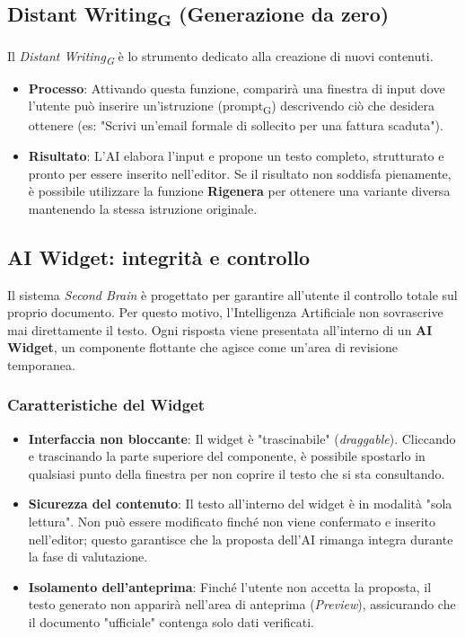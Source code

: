 \documentclass[11pt,a4paper]{article}
\newcommand{\gls}[1]{#1\textsubscript{G}}
\begin{document}
\subsection{\gls{Distant Writing} (Generazione da zero)}
Il \textit{\gls{Distant Writing}} è lo strumento dedicato alla creazione di nuovi contenuti. 
\begin{itemize}
    \item \textbf{Processo}: Attivando questa funzione, comparirà una finestra di input dove l'utente può inserire un'istruzione (\gls{prompt}) descrivendo ciò che desidera ottenere (es: "Scrivi un'email formale di sollecito per una fattura scaduta").
    \item \textbf{Risultato}: L'AI elabora l'input e propone un testo completo, strutturato e pronto per essere inserito nell'editor. Se il risultato non soddisfa pienamente, è possibile utilizzare la funzione \textbf{Rigenera} per ottenere una variante diversa mantenendo la stessa istruzione originale.
\end{itemize}

\subsection{AI Widget: integrità e controllo}
Il sistema \textit{Second Brain} è progettato per garantire all'utente il controllo totale sul proprio documento. Per questo motivo, l'Intelligenza Artificiale non sovrascrive mai direttamente il testo. Ogni risposta viene presentata all'interno di un \textbf{AI Widget}, un componente flottante che agisce come un'area di revisione temporanea.

\subsubsection{Caratteristiche del Widget}
\begin{itemize}
    \item \textbf{Interfaccia non bloccante}: Il widget è "trascinabile" (\textit{draggable}). Cliccando e trascinando la parte superiore del componente, è possibile spostarlo in qualsiasi punto della finestra per non coprire il testo che si sta consultando.
    \item \textbf{Sicurezza del contenuto}: Il testo all'interno del widget è in modalità "sola lettura". Non può essere modificato finché non viene confermato e inserito nell'editor; questo garantisce che la proposta dell'AI rimanga integra durante la fase di valutazione.
    \item \textbf{Isolamento dell'anteprima}: Finché l'utente non accetta la proposta, il testo generato non apparirà nell'area di anteprima (\textit{Preview}), assicurando che il documento "ufficiale" contenga solo dati verificati.
\end{itemize}
\end{document}

